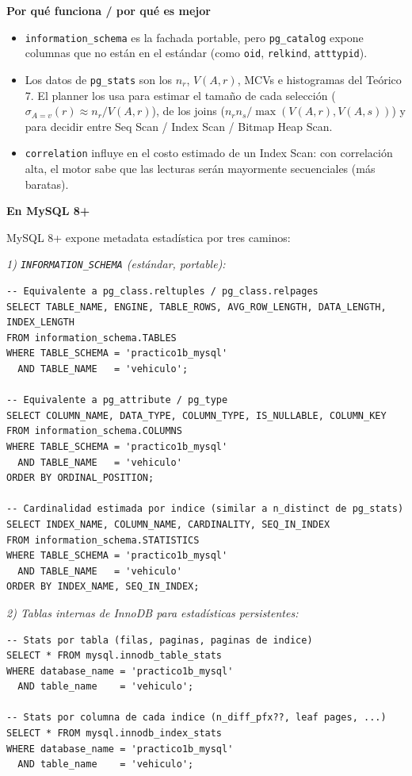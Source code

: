 \documentclass[11pt,a4paper]{article}
\newcommand{\sel}[1]{\sigma_{#1}}
\newcommand{\itemcabecera}[1]{\noindent\textbf{#1}\par\medskip}
\newcommand{\bloquePorque}{\itemcabecera{Por qu\'e funciona / por qu\'e es mejor}}
\newcommand{\bloqueMySQL}{\itemcabecera{En MySQL 8+}}
\begin{document}
\bloquePorque

\begin{itemize}
    \item \texttt{information\_schema} es la fachada portable, pero \texttt{pg\_catalog} expone columnas que no están en el estándar (como \texttt{oid}, \texttt{relkind}, \texttt{atttypid}).
    \item Los datos de \texttt{pg\_stats} son los $n_r$, $V(A,r)$, MCVs e histogramas del Teórico 7. El planner los usa para estimar el tamaño de cada selección ($\sel{A=v}(r)\approx n_r/V(A,r)$), de los joins ($n_r n_s / \max(V(A,r), V(A,s))$) y para decidir entre Seq Scan / Index Scan / Bitmap Heap Scan.
    \item \texttt{correlation} influye en el costo estimado de un Index Scan: con correlación alta, el motor sabe que las lecturas serán mayormente secuenciales (más baratas).
\end{itemize}

\bloqueMySQL

MySQL 8+ expone metadata estadística por tres caminos:

\textit{1) \texttt{INFORMATION\_SCHEMA} (estándar, portable):}

\begin{lstlisting}
-- Equivalente a pg_class.reltuples / pg_class.relpages
SELECT TABLE_NAME, ENGINE, TABLE_ROWS, AVG_ROW_LENGTH, DATA_LENGTH, INDEX_LENGTH
FROM information_schema.TABLES
WHERE TABLE_SCHEMA = 'practico1b_mysql'
  AND TABLE_NAME   = 'vehiculo';

-- Equivalente a pg_attribute / pg_type
SELECT COLUMN_NAME, DATA_TYPE, COLUMN_TYPE, IS_NULLABLE, COLUMN_KEY
FROM information_schema.COLUMNS
WHERE TABLE_SCHEMA = 'practico1b_mysql'
  AND TABLE_NAME   = 'vehiculo'
ORDER BY ORDINAL_POSITION;

-- Cardinalidad estimada por indice (similar a n_distinct de pg_stats)
SELECT INDEX_NAME, COLUMN_NAME, CARDINALITY, SEQ_IN_INDEX
FROM information_schema.STATISTICS
WHERE TABLE_SCHEMA = 'practico1b_mysql'
  AND TABLE_NAME   = 'vehiculo'
ORDER BY INDEX_NAME, SEQ_IN_INDEX;
\end{lstlisting}

\textit{2) Tablas internas de InnoDB para estadísticas persistentes:}

\begin{lstlisting}
-- Stats por tabla (filas, paginas, paginas de indice)
SELECT * FROM mysql.innodb_table_stats
WHERE database_name = 'practico1b_mysql'
  AND table_name    = 'vehiculo';

-- Stats por columna de cada indice (n_diff_pfx??, leaf pages, ...)
SELECT * FROM mysql.innodb_index_stats
WHERE database_name = 'practico1b_mysql'
  AND table_name    = 'vehiculo';
\end{lstlisting}
\end{document}
